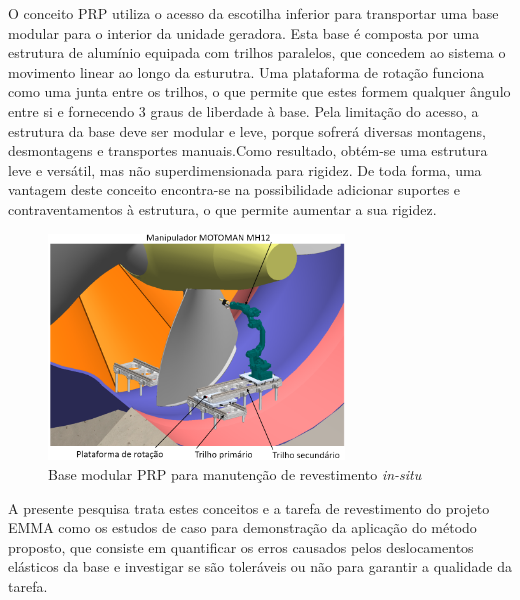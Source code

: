 O conceito PRP utiliza o acesso da escotilha inferior para transportar uma base
modular para o interior da unidade geradora. Esta base é composta por uma
estrutura de alumínio equipada com trilhos paralelos, que concedem ao sistema o
movimento linear ao longo da esturutra. Uma plataforma de rotação funciona como
uma junta entre os trilhos, o que permite que estes formem qualquer ângulo entre
si e fornecendo 3 graus de liberdade à base. Pela limitação do acesso, a
estrutura da base deve ser modular e leve, porque sofrerá diversas montagens,
desmontagens e transportes manuais.Como resultado, obtém-se uma estrutura leve e
versátil, mas não superdimensionada para rigidez. De toda forma, uma vantagem
deste conceito encontra-se na possibilidade adicionar suportes e
contraventamentos à estrutura, o que permite aumentar a sua rigidez.

\begin{figure}[h]
	\centering 
 	\includegraphics[width=0.70\textwidth]{figs/prp_turbina}
 	\caption{Base modular PRP para manutenção de revestimento \textit{in-situ}}
 	\label{fig::prp_turbina}
\end{figure}

A presente pesquisa trata estes conceitos e a tarefa de revestimento do projeto
EMMA como os estudos de caso para demonstração da aplicação do método proposto,
que consiste em quantificar os erros causados pelos deslocamentos elásticos da
base e investigar se são toleráveis ou não para garantir a qualidade da tarefa.


















